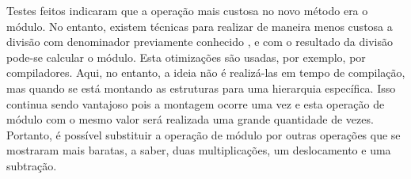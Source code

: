 


Testes feitos indicaram que a operação mais custosa no novo método era o módulo.
No entanto, existem técnicas para realizar de maneira menos custosa a divisão com denominador previamente conhecido \tratar{[referência]}, e com o resultado da divisão pode-se calcular o módulo.
Esta otimizações são usadas, por exemplo, por compiladores.
Aqui, no entanto, a ideia não é realizá-las em tempo de compilação, mas quando se está montando as estruturas para uma hierarquia específica.
Isso continua sendo vantajoso pois a montagem ocorre uma vez e esta operação de módulo com o mesmo valor será realizada uma grande quantidade de vezes.
Portanto, é possível substituir a operação de módulo por outras operações que se mostraram mais baratas, a saber, duas multiplicações, um deslocamento e uma subtração.







